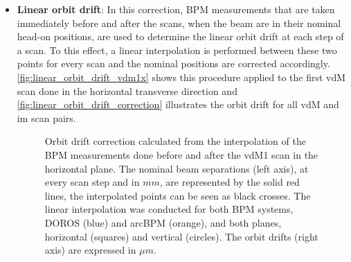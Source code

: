 \begin{itemize}
	\item \textbf{Linear orbit drift}: In this correction, BPM measurements that are taken immediately before and after the scans, when the beam are in their nominal head-on positions, are used to determine the linear orbit drift at each step of a scan. To this effect, a linear interpolation is performed between these two points for every scan and the nominal positions are corrected accordingly. \autoref{fig:linear_orbit_drift_vdm1x} shows this procedure applied to the first vdM scan done in the horizontal transverse direction and \autoref{fig:linear_orbit_drift_correction} illustrates the orbit drift for all vdM and im scan pairs.

	\begin{figure}[!htb]
		\centering
		\caption[Orbit drift correction calculation]{Orbit drift correction calculated from the interpolation of the BPM measurements done before and after the vdM1 scan in the horizontal plane. The nominal beam separations (left axis), at every scan step and in $mm$,  are represented by the solid red lines, the interpolated points can be seen as black crosses. The linear interpolation was conducted for both BPM systems, DOROS (blue) and arcBPM (orange), and both planes, horizontal (squares) and vertical (circles). The orbit drifts (right axis) are expressed in $\mu m$.}
		\label{fig:linear_orbit_drift_vdm1x}
	\end{figure}


\end{itemize}
